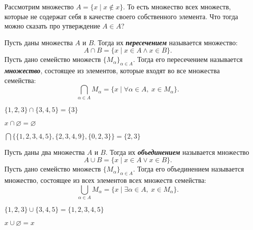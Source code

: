 \documentclass{article}
\begin{document}
    \begin{paradox_boxed}[ (Рассел)]
        Рассмотрим множество $A = \{x\mid x \notin x\}$.
        То есть множество всех множеств, которые не содержат себя в качестве своего собственного элемента.
        Что тогда можно сказать про утверждение $A \in A$?
    \end{paradox_boxed}

    \begin{definition_boxed}
        Пусть даны множества $A$ и $B$.
        Тогда их \textit{\textbf{пересечением}} называется множество: \[A \cap B = \{x \mid x\in A \wedge x \in B\}.\]
        Пусть дано семейство множеств $\{M_{\alpha}\}_{\alpha \in A}.$ Тогда его пересечением называется \textbf{\textit{множество}}, состоящее из элементов, которые входят во все множества семейства: \[\bigcap\limits_{\alpha \in A} M_{\alpha} = \{x \mid \forall \alpha \in A,\; x \in M_{\alpha}\}.\]
    \end{definition_boxed}

    \begin{example}
        $\{1,2,3\}\cap \{3,4,5\} = \{3\}$
    \end{example}

    \begin{example}
        $x \cap \varnothing = \varnothing$
    \end{example}

    \begin{example}
        $\bigcap \{\{1,2,3,4,5\}, \{2,3,4,9\}, \{0,2,3\}\} = \{2,3\}$
    \end{example}

    \begin{definition_boxed}
        Пусть даны два множества $A$ и $B$.
        Тогда их \textbf{\textit{объединением}} называется множество
        \[A \cup B = \{ x \mid x\in A \vee x\in B\}.\]
        Пусть дано семейство множеств $\{M_{\alpha}\}_{\alpha \in A}.$ Тогда его объединением называется множество, состоящее из всех элементов всех множеств семейства: \[\bigcup\limits_{\alpha \in A} M_{\alpha} = \{x \mid \exists \alpha \in A,\; x \in M_{\alpha}\}.\]
    \end{definition_boxed}

    \begin{example}
        $\{1,2,3\}\cup \{3,4,5\} = \{1,2,3,4,5\}$
    \end{example}

    \begin{example}
        $x \cup \varnothing = x$
    \end{example}
\end{document}
